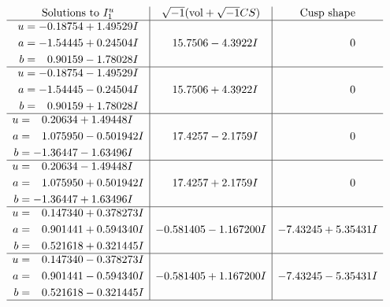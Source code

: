 \documentclass[1p]{elsarticle_modified}
\theoremstyle{definition}
\newcommand{\I}{\sqrt{-1}}
\begin{document}
$$\begin{array}{c|c|c}
\text{Solutions to }I^u_{1}& \I (\text{vol} + \sqrt{-1}CS) & \text{Cusp shape}\\
 \hline 
\begin{aligned}
u &= -0.18754 + 1.49529 I \\
a &= -1.54445 + 0.24504 I \\
b &= \phantom{-}0.90159 - 1.78028 I\end{aligned}
 & \phantom{-}15.7506 - 4.3922 I & \phantom{-0.000000 } 0 \\ \hline\begin{aligned}
u &= -0.18754 - 1.49529 I \\
a &= -1.54445 - 0.24504 I \\
b &= \phantom{-}0.90159 + 1.78028 I\end{aligned}
 & \phantom{-}15.7506 + 4.3922 I & \phantom{-0.000000 } 0 \\ \hline\begin{aligned}
u &= \phantom{-}0.20634 + 1.49448 I \\
a &= \phantom{-}1.075950 - 0.501942 I \\
b &= -1.36447 - 1.63496 I\end{aligned}
 & \phantom{-}17.4257 - 2.1759 I & \phantom{-0.000000 } 0 \\ \hline\begin{aligned}
u &= \phantom{-}0.20634 - 1.49448 I \\
a &= \phantom{-}1.075950 + 0.501942 I \\
b &= -1.36447 + 1.63496 I\end{aligned}
 & \phantom{-}17.4257 + 2.1759 I & \phantom{-0.000000 } 0 \\ \hline\begin{aligned}
u &= \phantom{-}0.147340 + 0.378273 I \\
a &= \phantom{-}0.901441 + 0.594340 I \\
b &= \phantom{-}0.521618 + 0.321445 I\end{aligned}
 & -0.581405 - 1.167200 I & -7.43245 + 5.35431 I \\ \hline\begin{aligned}
u &= \phantom{-}0.147340 - 0.378273 I \\
a &= \phantom{-}0.901441 - 0.594340 I \\
b &= \phantom{-}0.521618 - 0.321445 I\end{aligned}
 & -0.581405 + 1.167200 I & -7.43245 - 5.35431 I\\
 \hline 
 \end{array}$$\newpage\newpage\renewcommand{\arraystretch}{1}
\end{document}
